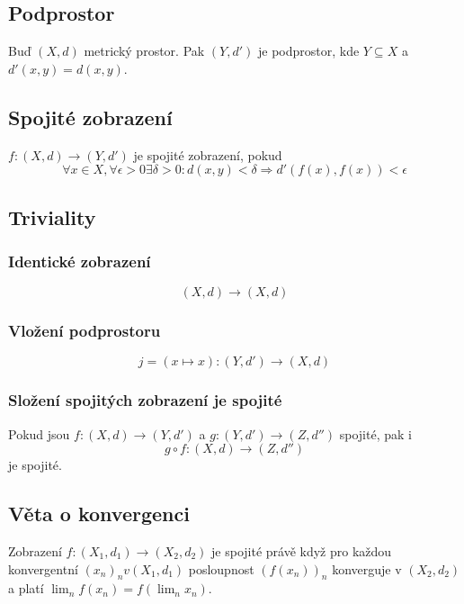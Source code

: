 \documentclass[../main.tex]{subfiles}
\begin{document}
\subsection{Podprostor}
\hspace{1.2mm}
\noindent
Buď $(X, d)$ metrický prostor. Pak $(Y, d')$ je podprostor, kde $Y \subseteq X$ a $d'(x,y) = d(x,y)$.

\subsection{Spojité zobrazení}
\hspace{1.2mm}
\noindent

$f: (X,d) \to (Y, d')$ je spojité zobrazení, pokud
\[ \forall x \in X, \forall \epsilon > 0 \exists \delta > 0:
d(x,y) < \delta \Rightarrow d'(f(x), f(x)) < \epsilon \]

\subsection{Triviality}
\subsubsection{Identické zobrazení}

\[ (X,d) \to (X,d) \]

\subsubsection{Vložení podprostoru}

\[ j = (x \mapsto x): (Y,d') \to (X,d) \]

\subsubsection{Složení spojitých zobrazení je spojité}

Pokud jsou $f: (X,d) \to (Y, d')$ a $g: (Y,d') \to (Z, d'')$ spojité, pak i
\[ g \circ f: (X,d) \to (Z,d'') \] je spojité.

\subsection{Věta o konvergenci}
\hspace{1.2mm}
Zobrazení $f: (X_1,d_1) \rightarrow (X_2,d_2)$ je spojité právě když pro každou konvergentní $(x_n)_n v (X_1,d_1)$ 
posloupnost $(f(x_n))_n$ konverguje v $(X_2,d_2)$ a platí $\lim_n f(x_n) = f(\lim_n x_n)$.
\end{document}
